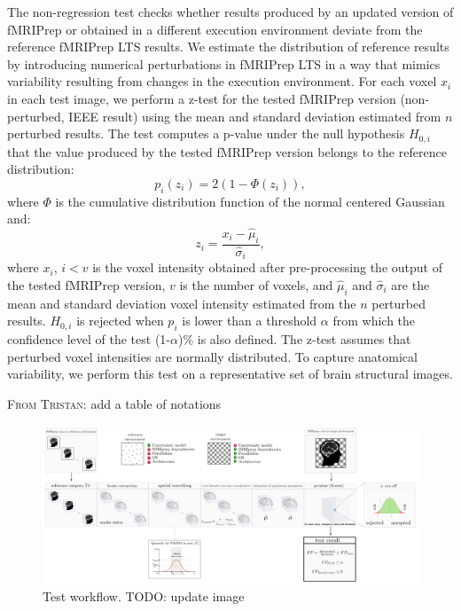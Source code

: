 \documentclass{article}
\newcommand{\TODO}[1]{\color{red}\textsc{TODO:} #1\color{black}\xspace}
\newcommand{\TG}[1]{\color{blue}\textsc{From Tristan:} #1\color{black}\xspace}
\begin{document}
The non-regression test checks whether results produced by an updated version of fMRIPrep or obtained in a different execution environment deviate from the reference fMRIPrep LTS results. We estimate the distribution of reference results by introducing numerical perturbations in fMRIPrep LTS in a way that mimics variability resulting from changes in the execution environment.  For each voxel $x_i$ in each test image, we perform a z-test for the tested fMRIPrep version (non-perturbed, IEEE result) using the mean and standard deviation estimated from $n$ perturbed results. The test computes a p-value under the null hypothesis $H_{0,i}$ that the value produced by the tested fMRIPrep version belongs to the reference distribution:
\begin{equation}
    p_i(z_i) = 2 \left(1-\Phi(z_i)\right) \label{pval},
\end{equation}
where $\Phi$ is the cumulative distribution function of the normal centered Gaussian and:
\begin{equation*}
    z_i = \frac{x_i-\hat \mu_i}{\hat \sigma_i},
\end{equation*}
where $x_i$, $i < v$ is the voxel intensity obtained after pre-processing the output of the tested fMRIPrep version, $v$ is the number of voxels, and $\hat \mu_i$ and $\hat \sigma_i$ are the mean and standard deviation voxel intensity estimated from the $n$ perturbed results. $H_{0,i}$ is rejected when $p_i$ is lower than a threshold $\alpha$ from which the confidence level of the test (1-$\alpha$)\% is also defined. The z-test assumes that perturbed voxel intensities are normally distributed. To capture anatomical variability, we perform this test on a representative set of brain structural images.

\TG{add a table of notations}

\begin{figure}
    \centering
    \includegraphics[width=\linewidth]{figures/test_workflow.png}
    \caption{Test workflow. \TODO{update image}}
    \label{fig:test_workflow}
\end{figure}
\end{document}
